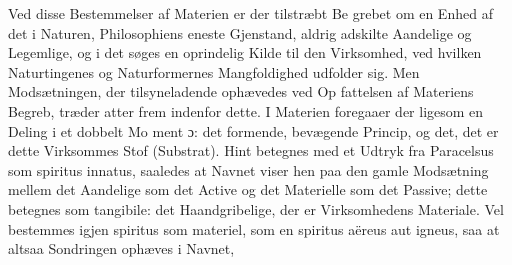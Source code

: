\documentclass[12pt,a4paper]{book}
\begin{document}
Ved disse Bestemmelser af Materien er der tilstræbt Be\-%
grebet om en Enhed af det i Naturen, Philosophiens eneste
Gjenstand, aldrig adskilte Aandelige og Legemlige, og i det
søges en oprindelig Kilde til den Virksomhed, ved hvilken
Naturtingenes og Naturformernes Mangfoldighed udfolder sig.
Men Modsætningen, der tilsyneladende ophævedes ved Op\-%
fattelsen af Materiens Begreb, træder atter frem indenfor dette.
I Materien foregaaer der ligesom en Deling i et dobbelt Mo\-%
ment ɔ: det formende, bevægende Princip, og det, det er dette
Virksommes Stof (Substrat). Hint betegnes med et Udtryk fra
Paracelsus som spiritus innatus, saaledes at Navnet viser hen
paa den gamle Modsætning mellem det Aandelige som det
Active og det Materielle som det Passive; dette betegnes som
tangibile: det Haandgribelige, der er Virksomhedens Materiale.
Vel bestemmes igjen spiritus som materiel, som en spiritus
aëreus aut igneus, saa at altsaa Sondringen ophæves i Navnet,
\end{document}
